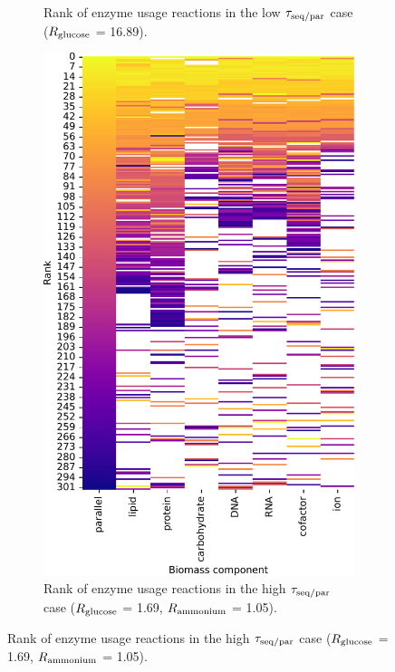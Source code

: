 \begin{figure}
\begin{subfigure}[t]{0.45\textwidth}
    \caption{
      Rank of enzyme usage reactions in the low $\tau_{\mathrm{seq}/\mathrm{par}}$ case ($R_{\mathrm{glucose}}$ = \SI{16.89}{\mmolgdwh}).
    }
    \label{fig:model-rank-glc-lowratio-rank}
  \end{subfigure}%
  \begin{subfigure}[t]{0.45\textwidth}
  \centering
    \includegraphics[width=\linewidth]{CompareEnzUse_glc01p69_pyrUnres_amm01p05_1.pdf}
    \caption{
      Rank of enzyme usage reactions in the high $\tau_{\mathrm{seq}/\mathrm{par}}$ case ($R_{\mathrm{glucose}}$ = \SI{1.69}{\mmolgdwh}, $R_{\mathrm{ammonium}}$ = \SI{1.05}{\mmolgdwh}).
    }
    \label{fig:model-rank-glc-highratio-rank}
  \end{subfigure}


\end{figure}
